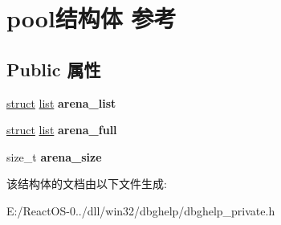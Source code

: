 \hypertarget{structpool}{}\section{pool结构体 参考}
\label{structpool}
\subsection*{Public 属性}
\begin{DoxyCompactItemize}
\item 
\mbox{\label{structpool_aa9cb4e12212179f687a1d5fa5a4ed498}} 
\hyperlink{interfacestruct}{struct} \hyperlink{classlist}{list} {\bfseries arena\+\_\+list}
\item 
\mbox{\label{structpool_af3aa2e80d78b274d819c9210caa4ce66}} 
\hyperlink{interfacestruct}{struct} \hyperlink{classlist}{list} {\bfseries arena\+\_\+full}
\item 
\mbox{\label{structpool_ae4c4d342d68e2a607842fb659aeed8e2}} 
size\+\_\+t {\bfseries arena\+\_\+size}
\end{DoxyCompactItemize}


该结构体的文档由以下文件生成\+:\begin{DoxyCompactItemize}
\item 
E\+:/\+React\+O\+S-\/0../dll/win32/dbghelp/dbghelp\+\_\+private.\+h\end{DoxyCompactItemize}
